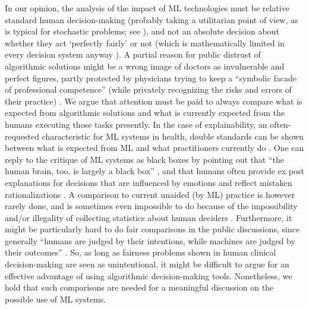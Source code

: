     In our opinion, the analysis of the impact of ML technologies must be relative standard human decision-making (probably taking a utilitarian point of view, as is typical for stochastic problems; see \cite{Hardin1989}), and not an absolute decision about whether they act `perfectly fairly' or not (which is mathematically limited in every decision system anyway \cite{Zerilli2019}).
    A partial reason for public distrust of algorithmic solutions might be a wrong image of doctors as invulnerable and perfect figures, partly protected by physicians trying to keep a ``symbolic facade of professional competence'' (while privately recognizing the risks and errors of their practice) \cite{Waring2005}.
    We argue that attention must be paid to always compare what is expected from algorithmic solutions and what is currently expected from the humans executing those tasks presently.
    In the case of explainability, an often-requested characteristic for ML systems in health, double standards can be shown between what is expected from ML and what practitioners currently do \cite{Zerilli2019}.
    One can reply to the critique of ML systems as black boxes by pointing out that ``the human brain, too, is largely a black box'' \cite[p.~666]{Zerilli2019}, and that humans often provide ex post explanations for decisions that are influenced by emotions and reflect mistaken rationalizations \cite{Zerilli2019}.
    A comparison to current unaided (by ML) practice is however rarely done, and is sometimes even impossible to do because of the impossibility and/or illegality of collecting statistics about human deciders \cite{Williamson2021}.
    Furthermore, it might be particularly hard to do fair comparisons in the public discussions, since generally ``humans are judged by their intentions, while machines are judged by their outcomes'' \cite[p.~139]{Hidalgo2021}.
    So, as long as fairness problems shown in human clinical decision-making are seen as unintentional, it might be difficult to argue for an effective advantage of using algorithmic decision-making tools.
    Nonetheless, we hold that such comparisons are needed for a meaningful discussion on the possible use of ML systems.


